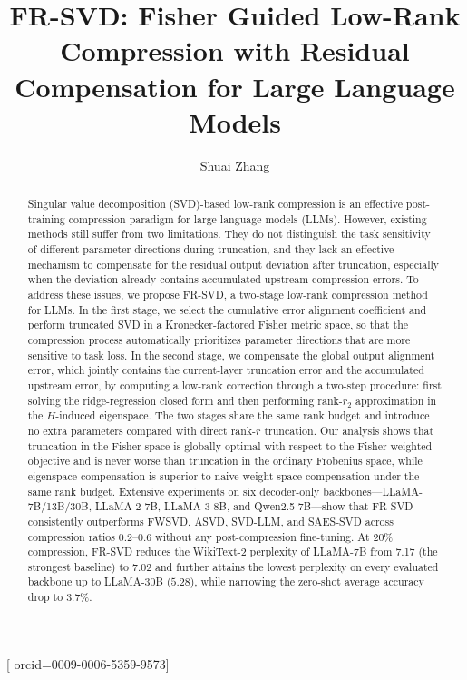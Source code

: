 \documentclass[a4paper,fleqn]{cas-dc}
\begin{document}
\let\WriteBookmarks\relax
\def\floatpagepagefraction{1}
\def\textpagefraction{.001}

\title[mode=title]{FR-SVD: Fisher Guided Low-Rank Compression with Residual Compensation for Large Language Models}

\author[1]{Shuai Zhang}[
  orcid=0009-0006-5359-9573]
\cormark[1]

\begin{abstract}
Singular value decomposition (SVD)-based low-rank compression is an effective post-training compression paradigm for large language models (LLMs). However, existing methods still suffer from two limitations. They do not distinguish the task sensitivity of different parameter directions during truncation, and they lack an effective mechanism to compensate for the residual output deviation after truncation, especially when the deviation already contains accumulated upstream compression errors. To address these issues, we propose FR-SVD, a two-stage low-rank compression method for LLMs. In the first stage, we select the cumulative error alignment coefficient and perform truncated SVD in a Kronecker-factored Fisher metric space, so that the compression process automatically prioritizes parameter directions that are more sensitive to task loss. In the second stage, we compensate the global output alignment error, which jointly contains the current-layer truncation error and the accumulated upstream error, by computing a low-rank correction through a two-step procedure: first solving the ridge-regression closed form and then performing rank-$r_2$ approximation in the $H$-induced eigenspace. The two stages share the same rank budget and introduce no extra parameters compared with direct rank-$r$ truncation. Our analysis shows that truncation in the Fisher space is globally optimal with respect to the Fisher-weighted objective and is never worse than truncation in the ordinary Frobenius space, while eigenspace compensation is superior to naive weight-space compensation under the same rank budget. Extensive experiments on six decoder-only backbones---LLaMA-7B/13B/30B, LLaMA-2-7B, LLaMA-3-8B, and Qwen2.5-7B---show that FR-SVD consistently outperforms FWSVD, ASVD, SVD-LLM, and SAES-SVD across compression ratios 0.2--0.6 without any post-compression fine-tuning. At 20\% compression, FR-SVD reduces the WikiText-2 perplexity of LLaMA-7B from 7.17 (the strongest baseline) to 7.02 and further attains the lowest perplexity on every evaluated backbone up to LLaMA-30B ($5.28$), while narrowing the zero-shot average accuracy drop to $3.7\%$.
\end{abstract}
\end{document}
